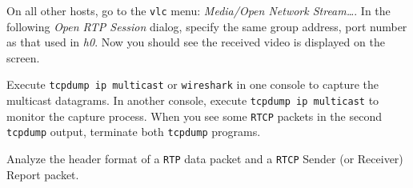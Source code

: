 \documentclass{../UTNetLab}
\begin{document}
    On all other hosts, go to the \lstinline{vlc} menu: \textit{Media/Open Network Stream\ldots}.
    In the following \textit{Open RTP Session} dialog, specify the same group address, port number as that used in \textit{h0}.%
    Now you should see the received video is displayed on the screen.

    Execute \lstinline{tcpdump ip multicast} or \lstinline{wireshark} in one console to capture the multicast datagrams.
    In another console, execute \lstinline{tcpdump ip multicast} to monitor the capture process.
    When you see some \texttt{RTCP} packets in the second \lstinline{tcpdump} output, terminate both \lstinline{tcpdump} programs.

    Analyze the header format of a \texttt{RTP} data packet and a \texttt{RTCP} Sender (or Receiver) Report packet.
\end{document}
